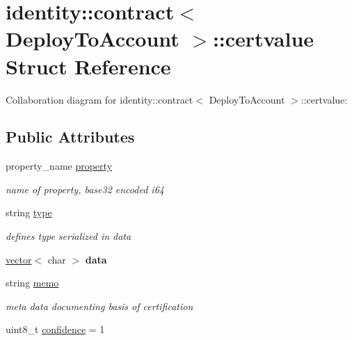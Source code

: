 \hypertarget{structidentity_1_1contract_1_1certvalue}{}\section{identity\+:\+:contract$<$ Deploy\+To\+Account $>$\+:\+:certvalue Struct Reference}
\label{structidentity_1_1contract_1_1certvalue}


Collaboration diagram for identity\+:\+:contract$<$ Deploy\+To\+Account $>$\+:\+:certvalue\+:
\subsection*{Public Attributes}
\begin{DoxyCompactItemize}
\item 
\mbox{\label{structidentity_1_1contract_1_1certvalue_ad1366909d2c56183fff34c0abc95b6d9}} 
property\+\_\+name \mbox{\hyperlink{structidentity_1_1contract_1_1certvalue_ad1366909d2c56183fff34c0abc95b6d9}{property}}
\begin{DoxyCompactList}\small\item\em name of property, base32 encoded i64 \end{DoxyCompactList}\item 
\mbox{\label{structidentity_1_1contract_1_1certvalue_af1a8d723edcf8c758356e40893ac97ba}} 
string \mbox{\hyperlink{structidentity_1_1contract_1_1certvalue_af1a8d723edcf8c758356e40893ac97ba}{type}}
\begin{DoxyCompactList}\small\item\em defines type serialized in data \end{DoxyCompactList}\item 
\mbox{\label{structidentity_1_1contract_1_1certvalue_aad857a1c60e020b93f569908821f4f44}} 
\mbox{\hyperlink{classstd_1_1vector}{vector}}$<$ char $>$ {\bfseries data}
\item 
\mbox{\label{structidentity_1_1contract_1_1certvalue_aed802c2c283d6d5d526212d0a683b238}} 
string \mbox{\hyperlink{structidentity_1_1contract_1_1certvalue_aed802c2c283d6d5d526212d0a683b238}{memo}}
\begin{DoxyCompactList}\small\item\em meta data documenting basis of certification \end{DoxyCompactList}\item 
uint8\+\_\+t \mbox{\hyperlink{structidentity_1_1contract_1_1certvalue_a009857ed1526837660ba974428e7fcf9}{confidence}} = 1
\end{DoxyCompactItemize}


